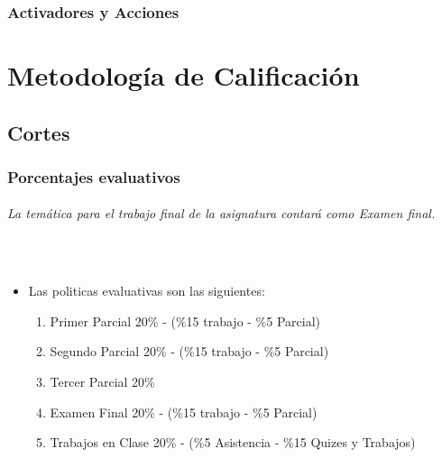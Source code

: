 \documentclass[a4paper]{report} %
\begin{document}
        \section{Activadores y Acciones}
    \part{}
    \part{}
    \part{}
    \part{}
    \part{Metodología de Calificación}
      \chapter{Cortes}
        \section{Porcentajes evaluativos}
          \paragraph{La temática para el trabajo final de la asignatura contará como \textit{Examen final}.}\mbox{}\\
            \begin{itemize}
              \item Las politicas evaluativas son las siguientes:
              \begin{enumerate}
                \item Primer Parcial 20\% - (\%15 trabajo - \%5 Parcial)
                \item Segundo Parcial 20\% - (\%15 trabajo - \%5 Parcial)
                \item Tercer Parcial 20\%
                \item Examen Final 20\% - (\%15 trabajo - \%5 Parcial)
                \item Trabajos en Clase 20\% - (\%5 Asistencia - \%15 Quizes y Trabajos)
              \end{enumerate}
            \end{itemize}
\end{document}

